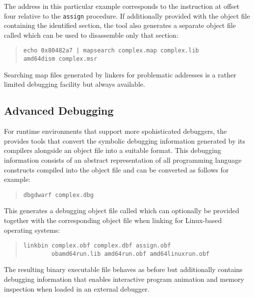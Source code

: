 The address in this particular example corresponds to the instruction at offset four relative to the \texttt{assign} procedure.
If additionally provided with the object file containing the identified section, the tool also generates a separate object file called  which can be used to disassemble only that section:

\begin{quote}\begin{verbatim}
echo 0x80482a7 | mapsearch complex.map complex.lib
amd64dism complex.msr
\end{verbatim}\end{quote}

Searching map files generated by linkers for problematic addresses is a rather limited debugging facility but always available.

\subsection{Advanced Debugging}

For runtime environments that support more spohisticated debuggers, the \ecs{} provides tools that convert the symbolic debugging information generated by its compilers alongside an object file into a suitable format.
This debugging information consists of an abstract representation of all programming language constructs compiled into the object file and can be converted as follows for example:

\begin{quote}\begin{verbatim}
dbgdwarf complex.dbg
\end{verbatim}\end{quote}

This generates a debugging object file called  which can optionally be provided together with the corresponding object file when linking for Linux-based operating systems:

\begin{quote}\begin{verbatim}
linkbin complex.obf complex.dbf assign.obf
        obamd64run.lib amd64run.obf amd64linuxrun.obf
\end{verbatim}\end{quote}

The resulting binary executable file behaves as before but additionally contains debugging information that enables interactive program animation and memory inspection when loaded in an external debugger.

